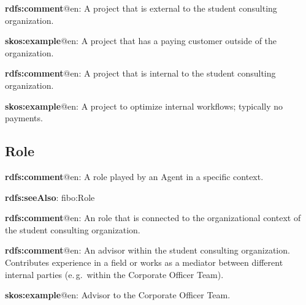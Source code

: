 \documentclass[a4paper, DIV=13, BCOR=0cm]{scrbook}
\newcommand{\eg}{e.\,g.\ }
\begin{document}
\begin{mdframed}[style=onto-1, frametitle={External Project}]
	{%
		\begin{compactitem}
			\item \textbf{rdfs:comment}@en: A project that is external to the student consulting organization.
			\item \textbf{skos:example}@en: A project that has a paying customer outside of the organization.
		\end{compactitem}
	} %
\end{mdframed}

\begin{mdframed}[style=onto-1, frametitle={Internal Project}]
	{%
		\begin{compactitem}
			\item \textbf{rdfs:comment}@en: A project that is internal to the student consulting organization.
			\item \textbf{skos:example}@en: A project to optimize internal workflows; typically no payments.
		\end{compactitem}
	} %
\end{mdframed}

\subsection{Role}
\begin{mdframed}[style=onto, frametitle={Role}]
	{%
		\begin{compactitem}
			\item \textbf{rdfs:comment}@en: A role played by an Agent in a specific context.
			\item \textbf{rdfs:seeAlso}: fibo:Role
		\end{compactitem}
	} %
\end{mdframed}

\begin{mdframed}[style=onto-1, frametitle={Organizational Role}]
	{%
		\begin{compactitem}
			\item \textbf{rdfs:comment}@en: An role that is connected to the organizational context of the student consulting organization.
		\end{compactitem}
	} %
\end{mdframed}

\begin{mdframed}[style=onto-2, frametitle={Advisor}]
	{%
		\begin{compactitem}
			\item \textbf{rdfs:comment}@en: An advisor within the student consulting organization. Contributes experience in a field or works as a mediator between different internal parties (\eg within the Corporate Officer Team).
			\item \textbf{skos:example}@en: Advisor to the Corporate Officer Team.
		\end{compactitem}
	} %
\end{mdframed}
\end{document}
